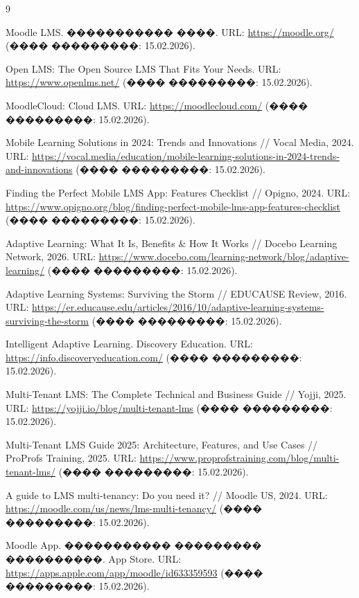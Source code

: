 \documentclass{G7-32}
\begin{document}

\begin{thebibliography}{9}

Moodle LMS. ����������� ����. URL: \url{https://moodle.org/} (���� ���������: 15.02.2026).

Open LMS: The Open Source LMS That Fits Your Needs. URL: \url{https://www.openlms.net/} (���� ���������: 15.02.2026).

MoodleCloud: Cloud LMS. URL: \url{https://moodlecloud.com/} (���� ���������: 15.02.2026).

Mobile Learning Solutions in 2024: Trends and Innovations // Vocal Media, 2024. URL: \url{https://vocal.media/education/mobile-learning-solutions-in-2024-trends-and-innovations} (���� ���������: 15.02.2026).

Finding the Perfect Mobile LMS App: Features Checklist // Opigno, 2024. URL: \url{https://www.opigno.org/blog/finding-perfect-mobile-lms-app-features-checklist} (���� ���������: 15.02.2026).

Adaptive Learning: What It Is, Benefits \& How It Works // Docebo Learning Network, 2026. URL: \url{https://www.docebo.com/learning-network/blog/adaptive-learning/} (���� ���������: 15.02.2026).

Adaptive Learning Systems: Surviving the Storm // EDUCAUSE Review, 2016. URL: \url{https://er.educause.edu/articles/2016/10/adaptive-learning-systems-surviving-the-storm} (���� ���������: 15.02.2026).

Intelligent Adaptive Learning. Discovery Education. URL: \url{https://info.discoveryeducation.com/} (���� ���������: 15.02.2026).

Multi-Tenant LMS: The Complete Technical and Business Guide // Yojji, 2025. URL: \url{https://yojji.io/blog/multi-tenant-lms} (���� ���������: 15.02.2026).

Multi-Tenant LMS Guide 2025: Architecture, Features, and Use Cases // ProProfs Training, 2025. URL: \url{https://www.proprofstraining.com/blog/multi-tenant-lms/} (���� ���������: 15.02.2026).

A guide to LMS multi-tenancy: Do you need it? // Moodle US, 2024. URL: \url{https://moodle.com/us/news/lms-multi-tenancy/} (���� ���������: 15.02.2026).

Moodle App. ����������� ��������� ����������. App Store. URL: \url{https://apps.apple.com/app/moodle/id633359593} (���� ���������: 15.02.2026).

\end{thebibliography}
\end{document}
